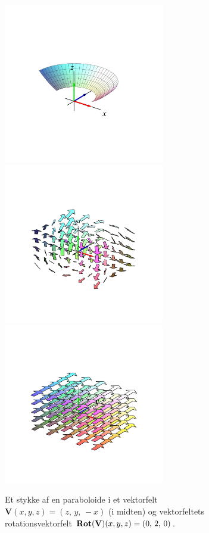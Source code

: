 \begin{figure}[h]
\centerline{\includegraphics[height=70mm]{FIGS/plotParab1}\includegraphics[height=70mm]{FIGS/plotParab2}\includegraphics[height=70mm]{FIGS/plotParab3}}
\begin{center}
\caption{\small{Et stykke af en paraboloide i et vektorfelt $\mathbf{V}(x,y,z) = (z, \,y, \, -x)$ (i midten) og  vektorfeltets rotationsvektorfelt  $\operatorname{\mathbf{Rot}}(\mathbf{V})(x,y,z)= (0, \, 2, \, 0)$.}}
\label{figParabA}
\end{center}
\end{figure}


